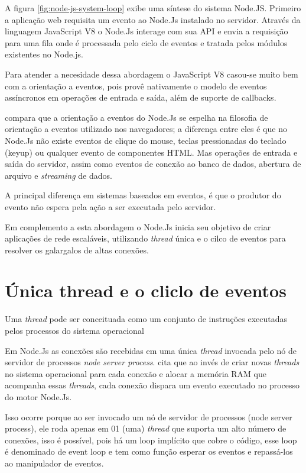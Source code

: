   A figura \ref{fig:node-js-system-loop} exibe uma síntese do sistema Node.JS. Primeiro a aplicação web requisita um evento 
  ao Node.Js instalado no servidor. Através da linguagem JavaScript V8 o Node.Js interage com sua \ac{API} e envia 
  a requisição para uma fila onde é processada pelo ciclo de eventos e tratada pelos módulos existentes no Node.js. 
  
  Para atender a necesidade dessa abordagem o JavaScript V8 casou-se muito bem com a orientação a eventos, pois provê nativamente
  o modelo de eventos assíncronos em operações de entrada e saída, além de suporte de callbacks.\cite{Oliveira:2012}

   compara que a orientação a eventos do Node.Js se espelha na filosofia de orientação 
  a eventos utilizado nos navegadores; a diferença entre eles é que no Node.Js 
  não existe eventos de clique do mouse, teclas pressionadas do teclado (keyup) ou qualquer evento de componentes HTML. Mas operações
  de entrada e saída do servidor, assim como eventos de conexão ao banco de dados, abertura de arquivo e \textit{streaming}
  de dados.
  
  A principal diferença em sistemas baseados em eventos, é que o produtor do evento não espera pela ação a ser executada
  pelo servidor. \cite{Junior:2012}    

  Em complemento a esta abordagem o Node.Js inicia seu objetivo de criar aplicações de rede escaláveis, utilizando \textit{thread} única
  e o cilco de eventos para resolver os galargalos de altas conexões.

\section{Única thread e o cliclo de eventos}
\label{single-thread}

  Uma \textit{thread} pode ser conceituada como um conjunto de instruções executadas pelos processos do sistema operacional
  
  Em Node.Js as conexões são recebidas em uma única \textit{thread} invocada pelo nó de servidor de processos \textit{node server process}.
   cita que ao invés de criar novas \textit{threads}
  no sistema operacional para cada conexão e alocar a memória RAM que acompanha essas \textit{threads}, 
  cada conexão dispara um evento executado no processo do motor Node.Js.
  
  Isso ocorre porque ao ser invocado um nó de servidor de processos (node server
  process), ele roda apenas em 01 (uma) \textit{thread} que suporta um alto número de conexões, isso é
  possível, pois há um loop implícito que cobre o código, esse loop é denominado de event loop
  e tem como função esperar os eventos e repassá-los ao manipulador de eventos. \cite{Tilkov:2010}
  
